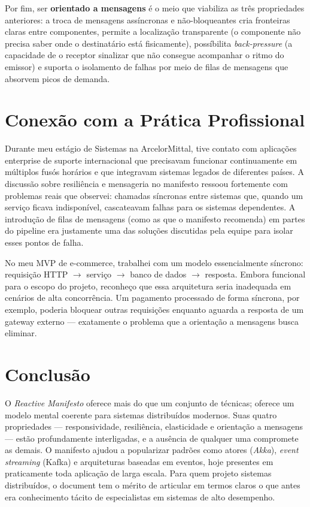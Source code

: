 \documentclass[12pt,a4paper]{article}
\begin{document}
Por fim, ser \textbf{orientado a mensagens} \'e o meio que viabiliza as tr\^es
propriedades anteriores: a troca de mensagens ass\'incronas e n\~ao-bloqueantes
cria fronteiras claras entre componentes, permite a localiza\c{c}\~ao transparente
(o componente n\~ao precisa saber onde o destinat\'ario est\'a fisicamente),
poss\'ibilita \textit{back-pressure} (a capacidade de o receptor sinalizar que
n\~ao consegue acompanhar o ritmo do emissor) e suporta o isolamento de falhas
por meio de filas de mensagens que absorvem picos de demanda.

\section{Conex\~ao com a Pr\'atica Profissional}

Durante meu est\'agio de Sistemas na ArcelorMittal, tive contato com aplica\c{c}\~oes
enterprise de suporte internacional que precisavam funcionar continuamente em
m\'ultiplos fus\'os hor\'arios e que integravam sistemas legados de diferentes
pa\'ises. A discuss\~ao sobre resili\^encia e mensageria no manifesto ressoou
fortemente com problemas reais que observei: chamadas s\'incronas entre sistemas
que, quando um servi\c{c}o ficava indispon\'ivel, cascateavam falhas para os sistemas
dependentes. A introdu\c{c}\~ao de filas de mensagens (como as que o manifesto
recomenda) em partes do pipeline era justamente uma das solu\c{c}\~oes discutidas
pela equipe para isolar esses pontos de falha.

No meu MVP de e-commerce, trabalhei com um modelo essencialmente s\'incrono:
requisi\c{c}\~ao HTTP $\to$ servi\c{c}o $\to$ banco de dados $\to$ resposta.
Embora funcional para o escopo do projeto, reconheço que essa arquitetura seria
inadequada em cen\'arios de alta concorr\^encia. Um pagamento processado de forma
s\'incrona, por exemplo, poderia bloquear outras requisi\c{c}\~oes enquanto aguarda
a resposta de um gateway externo --- exatamente o problema que a orienta\c{c}\~ao
a mensagens busca eliminar.

\section{Conclus\~ao}

O \textit{Reactive Manifesto} oferece mais do que um conjunto de t\'ecnicas;
oferece um modelo mental coerente para sistemas distribu\'idos modernos. Suas
quatro propriedades --- responsividade, resili\^encia, elasticidade e orienta\c{c}\~ao
a mensagens --- est\~ao profundamente interligadas, e a aus\^encia de qualquer uma
compromete as demais. O manifesto ajudou a popularizar padr\~oes como atores
(\textit{Akka}), \textit{event streaming} (Kafka) e arquiteturas baseadas em eventos,
hoje presentes em praticamente toda aplica\c{c}\~ao de larga escala. Para quem
projeto sistemas distribu\'idos, o document tem o m\'erito de articular em termos
claros o que antes era conhecimento t\'acito de especialistas em sistemas de alto
desempenho.
\end{document}
